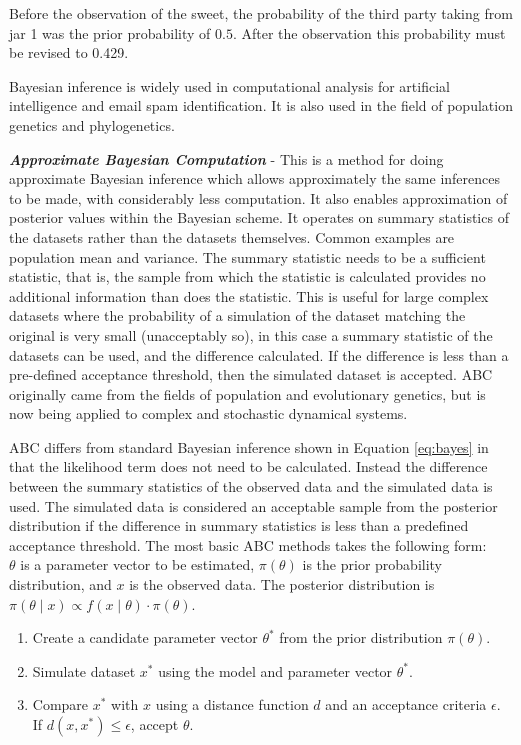 Before the observation of the sweet, the probability of the third party taking from jar 1 was the prior probability of $0.5$. After the observation this probability must be revised to 0.429.

Bayesian inference is widely used in computational analysis for artificial intelligence and email spam identification. It is also used in the field of population genetics and phylogenetics\cite{Ronquist2011}.

\textbf{\textit{Approximate Bayesian Computation}} - This is a method for doing approximate Bayesian inference which allows approximately the same inferences to be made, with considerably less computation. It also enables approximation of posterior values within the Bayesian scheme. It operates on summary statistics of the datasets rather than the datasets themselves. Common examples are population mean and variance. The summary statistic needs to be a sufficient statistic, that is, the sample from which the statistic is calculated provides no additional information than does the statistic. This is useful for large complex datasets where the probability of a simulation of the dataset matching the original is very small (unacceptably so), in this case a summary statistic of the datasets can be used, and the difference calculated. If the difference is less than a pre-defined acceptance threshold, then the simulated dataset is accepted. ABC originally came 
from the fields of 
population and evolutionary genetics\cite{Beaumont2002}, but is now being applied to complex and stochastic dynamical systems\cite{Sisson2007,Toni2009,Beaumont2010}.

ABC differs from standard Bayesian inference shown in Equation \ref{eq:bayes} in that the likelihood term does not need to be calculated. Instead the difference between the summary statistics of the observed data and the simulated data is used. The simulated data is considered an acceptable sample from the posterior distribution if the difference in summary statistics is less than a predefined acceptance threshold.
The most basic ABC methods takes the following form:\\
$\theta$ is a parameter vector to be estimated, $\pi(\theta)$ is the prior probability distribution, and $x$ is the observed data. The posterior distribution is $\pi(\theta \mid x) \propto f(x \mid \theta)\cdot \pi(\theta)$.
\begin{enumerate}
	\item Create a candidate parameter vector $\theta^*$ from the prior distribution $\pi(\theta)$.
	\item Simulate dataset $x^*$ using the model and parameter vector $\theta^*$.
	\item Compare $x^*$ with $x$ using a distance function $d$ and an acceptance criteria $\epsilon$. If $d(x,x^*)\leq \epsilon$, accept $\theta$.
\end{enumerate}

